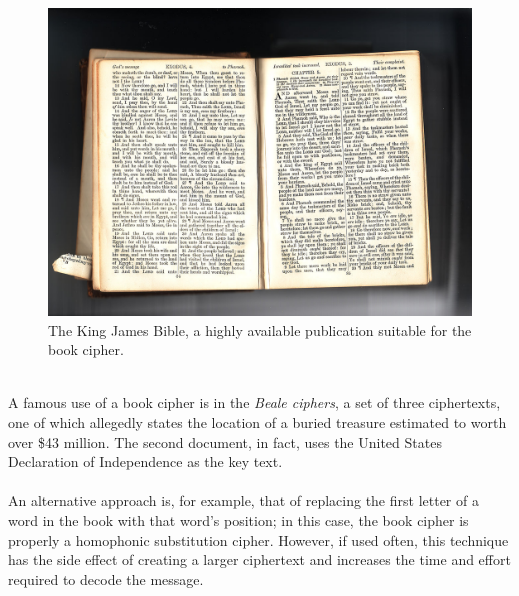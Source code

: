 \documentclass[Lau,binding=0.6cm,oneside]{sapthesis}
\begin{document}
\begin{figure}[H]
\includegraphics[scale=0.9]{king_james_bible}
\captionsetup{justification=centering, margin=2cm}
\centering
\caption{The King James Bible, a highly available publication suitable for the book cipher.}
\centering
\end{figure}
\ \\
A famous use of a book cipher is in the \textit{Beale ciphers}, a set of three ciphertexts, one of which allegedly states the location of a buried treasure estimated to worth over \$43 million. The second document, in fact, uses the United States Declaration of Independence as the key text.\\\\
An alternative approach is, for example, that of replacing the first letter of a word in the book with that word's position; in this case, the book cipher is properly a homophonic substitution cipher. However, if used often, this technique has the side effect of creating a larger ciphertext and increases the time and effort required to decode the message.
\end{document}

